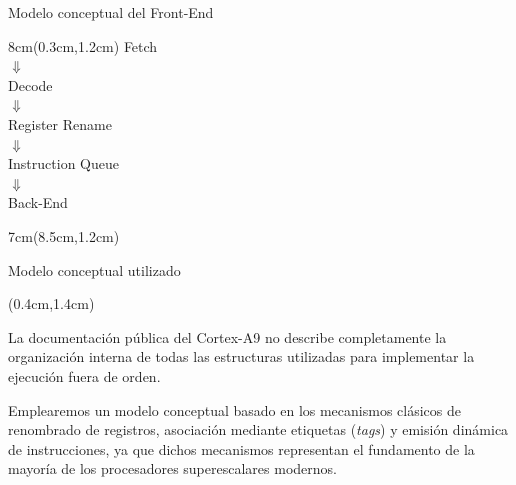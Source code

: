 \begin{frame}{Modelo conceptual del Front-End}
 \begin{textblock*}{8cm}(0.3cm,1.2cm)
 \centering
 \Large
 Fetch\\
 $\Downarrow$\\
 Decode\\
 $\Downarrow$\\
 Register Rename\\
 $\Downarrow$\\
 Instruction Queue\\
 $\Downarrow$\\
 Back-End\\
 \end{textblock*}
 \begin{textblock*}{7cm}(8.5cm,1.2cm)
 \justifying
 \vspace{0.3cm}
 \vspace{0.3cm}
 \end{textblock*}
\end{frame}

\begin{frame}{Modelo conceptual utilizado}
 \begin{textblock*}{\textwidth}(0.4cm,1.4cm)
  \begin{tcolorbox}[enhanced jigsaw,colback=blue!4]
   \justifying
   La documentación pública del Cortex-A9 no describe completamente la organización interna de todas las estructuras utilizadas para implementar la ejecución fuera de orden.

   Emplearemos un modelo conceptual basado en los mecanismos clásicos de renombrado de registros, asociación mediante etiquetas (\textit{tags}) y emisión dinámica de instrucciones, ya que dichos mecanismos representan el fundamento de la mayoría de los procesadores superescalares modernos.
  \end{tcolorbox}
 \end{textblock*}
\end{frame}


